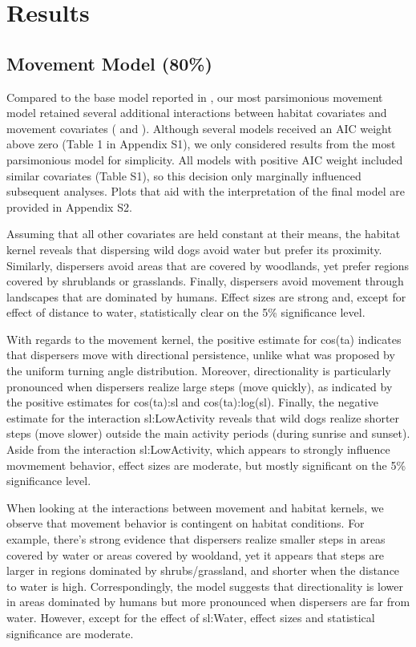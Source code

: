 \documentclass[abstract=on,10pt,a4paper,bibliography=totocnumbered]{article}
\begin{document}
\section{Results}
\subsection{Movement Model (80\%)}
Compared to the base model reported in \citep{Hofmann.2021}, our most
parsimonious movement model retained several additional interactions between
habitat covariates and movement covariates ( and
). Although several models received an AIC weight
above zero (Table 1 in Appendix S1), we only considered results from the most
parsimonious model for simplicity. All models with positive AIC weight included
similar covariates (Table S1), so this decision only marginally influenced
subsequent analyses. Plots that aid with the interpretation of the final model
are provided in Appendix S2.

Assuming that all other covariates are held constant at their means, the habitat
kernel reveals that dispersing wild dogs avoid water but prefer its proximity.
Similarly, dispersers avoid areas that are covered by woodlands, yet prefer
regions covered by shrublands or grasslands. Finally, dispersers avoid movement
through landscapes that are dominated by humans. Effect sizes are strong and,
except for effect of \textsf{distance to water}, statistically clear on the 5\%
significance level.

With regards to the movement kernel, the positive estimate for \textsf{cos(ta)}
indicates that dispersers move with directional persistence, unlike what was
proposed by the uniform turning angle distribution. Moreover, directionality is
particularly pronounced when dispersers realize large steps (move quickly), as
indicated by the positive estimates for \textsf{cos(ta):sl} and
\textsf{cos(ta):log(sl)}. Finally, the negative estimate for the interaction
\textsf{sl:LowActivity} reveals that wild dogs realize shorter steps (move
slower) outside the main activity periods (during sunrise and sunset). Aside
from the interaction \textsf{sl:LowActivity}, which appears to strongly
influence movmement behavior, effect sizes are moderate, but mostly significant
on the 5\% significance level.

When looking at the interactions between movement and habitat kernels, we
observe that movement behavior is contingent on habitat conditions. For example,
there's strong evidence that dispersers realize smaller steps in areas covered
by water or areas covered by wooldand, yet it appears that steps are larger in
regions dominated by shrubs/grassland, and shorter when the distance to water is
high. Correspondingly, the model suggests that directionality is lower in areas
dominated by humans but more pronounced when dispersers are far from water.
However, except for the effect of \textsf{sl:Water}, effect sizes and
statistical significance are moderate.
\end{document}
